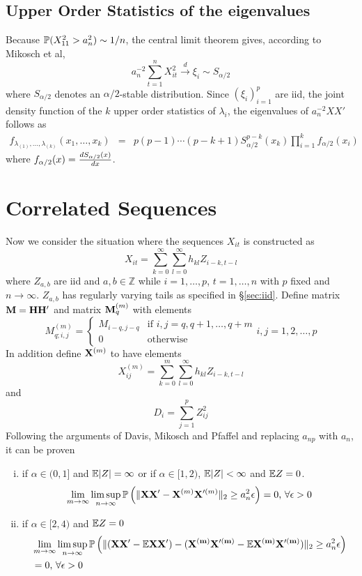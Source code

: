 \documentclass{article}
\begin{document}
\subsection{Upper Order Statistics of the eigenvalues}
Because $\mathbb{P}(X_{11}^2 > a_n^2) \sim 1/n$, the central limit theorem
gives, according to Mikosch et al\cite{Embrechts1997},
\[
a_n^{-2} \sum_{t=1}^n X_{it}^2 \xrightarrow{d} \xi_i \sim S_{\alpha/2}
\]
where $S_{\alpha/2}$ denotes an $\alpha/2$-stable distribution. Since
$(\xi_i)_{i=1}^p$ are iid, the joint density function of the $k$ upper
order statistics of $\lambda_i$, the eigenvalues of $a_n^{-2} X X'$
follows as
\begin{eqnarray*}
  f_{\lambda_{(1)}, \dots, \lambda_{(k)}}(x_1, \dots, x_k) &=&
  p(p-1)\cdots(p-k+1) S_{\alpha/2}^{p-k}(x_k) \prod_{i=1}^k
  f_{\alpha/2}(x_i)
\end{eqnarray*}
where $f_{\alpha/2}(x) = {d S_{\alpha/2}(x) \over dx}$.

\section{Correlated Sequences}
Now we consider the situation where the sequences $X_{it}$ is
constructed as
\[
X_{it} = \sum_{k=0}^{\infty} \sum_{l=0}^{\infty} h_{kl} Z_{i-k, t-l}
\]
where $Z_{a,b}$ are iid and $a,b \in \mathbb{Z}$ while $i=1,\dots,p$,
$t=1,\dots,n$ with $p$ fixed and $n \to \infty$. $Z_{a,b}$ has
regularly varying tails as specified in \S\ref{sec:iid}.
Define matrix $\mathbf{M} = \mathbf{H H'}$ and matrix $\mathbf{M}^{(m)}_q$ with
elements
\[
M^{(m)}_{q; i,j} = \left\{
  \begin{array}{ll}
    M_{i-q, j-q} & \text{if } i,j = q, q+1, \dots, q+m \\
    0 & \text{otherwise}
  \end{array}
\right.
i,j = 1,2,\dots,p
\]
In addition define $\mathbf{X}^{(m)}$ to have elements
\[
X^{(m)}_{ij} = \sum_{k=0}^{m} \sum_{l=0}^{\infty} h_{kl} Z_{i-k, t-l}
\]
and
\[
D_i = \sum_{j=1}^p Z_{ij}^2
\]
Following the arguments of Davis, Mikosch and
Pfaffel\cite{Mikosch2014} and replacing $a_{np}$ with $a_n$, it can be
proven
\begin{enumerate}[i)]
\item if $\alpha \in (0, 1]$ and $\mathbb{E}|Z| = \infty$ or if $\alpha \in
  [1, 2)$, $\mathbb{E}|Z| < \infty$ and $\mathbb{E} Z = 0$.
  \[
  \lim_{m\to \infty} \limsup_{n\to\infty} \mathbb{P}\left(
    \|\mathbf{X X'} - \mathbf{X}^{(m)} \mathbf{X}'^{(m)}\|_2 \geq a_n^2 \epsilon
  \right) = 0 \text{, } \forall \epsilon > 0  
  \]
\item if $\alpha \in [2, 4)$ and $\mathbb{E} Z = 0$
  \begin{align*}
    & \lim_{m\to \infty} \limsup_{n\to\infty} \mathbb{P}\left(
      \|(\mathbf{XX'} - \mathbb{E}\mathbf{XX'}) - (\mathbf{X^{(m)} X'^{(m)}} - \mathbb{E}
      \mathbf{X^{(m)} X'^{(m)}})\|_2 \geq a_n^2 \epsilon \right) \\
    &= 0 \text{, } \forall \epsilon > 0
  \end{align*}
\end{enumerate}
\end{document}
